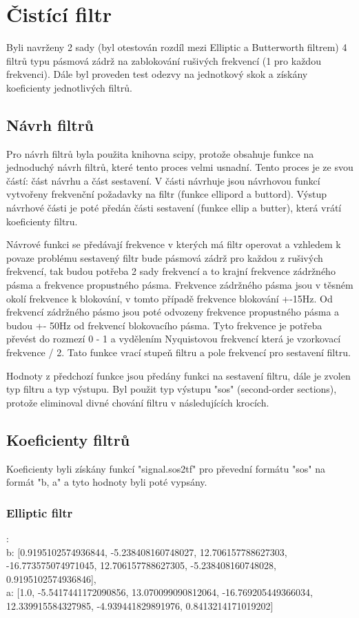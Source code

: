 \section{Čistící filtr}

Byli navrženy 2 sady (byl otestován rozdíl mezi Elliptic a Butterworth filtrem) 4 filtrů typu pásmová zádrž na zablokování rušivých frekvencí (1 pro každou frekvenci).
Dále byl proveden test odezvy na jednotkový skok a získány koeficienty jednotlivých filtrů.

\subsection{Návrh filtrů}
Pro návrh filtrů byla použita knihovna scipy, protože obsahuje funkce na jednoduchý návrh filtrů, které tento proces velmi usnadní.
Tento proces je ze svou částí: část návrhu a část sestavení.
V části návrhuje jsou návrhovou funkcí vytvořeny frekvenční požadavky na filtr (funkce ellipord a buttord). Výstup návrhové části je poté předán části sestavení (funkce ellip a butter), která vrátí koeficienty filtru.

Návrové funkci se předávají frekvence v kterých má filtr operovat a vzhledem k povaze problému sestavený filtr bude pásmová zádrž pro každou z rušivých frekvencí, tak budou potřeba 2 sady frekvencí a to krajní frekvence zádržného pásma a frekvence propustného pásma.
Frekvence zádržného pásma jsou v těsném okolí frekvence k blokování, v tomto případě frekvence blokování +-15Hz.
Od frekvencí zádržného pásmo jsou poté odvozeny frekvence propustného pásma a budou +- 50Hz od frekvencí blokovacího pásma.
Tyto frekvence je potřeba převést do rozmezí 0 - 1 a vydělením Nyquistovou frekvencí která je vzorkovací frekvence / 2.
Tato funkce vrací stupeň filtru a pole frekvencí pro sestavení filtru.

Hodnoty z předchozí funkce jsou předány funkci na sestavení filtru, dále je zvolen typ filtru a typ výstupu. Byl použit typ výstupu "sos" (second-order sections), protože eliminoval divné chování filtru v následujících krocích.

\subsection{Koeficienty filtrů}
Koeficienty byli získány funkcí "signal.sos2tf" pro převední formátu "sos" na formát "b, a" a tyto hodnoty byli poté vypsány.

\subsubsection{Elliptic filtr}
:\\
b: [0.9195102574936844, -5.238408160748027, 12.706157788627303, -16.773575074971045, 12.706157788627305, -5.238408160748028, 0.9195102574936846],\\
a: [1.0, -5.5417441172090856, 13.070099090812064, -16.769205449366034, 12.339915584327985, -4.939441829891976, 0.8413214171019202]\\

